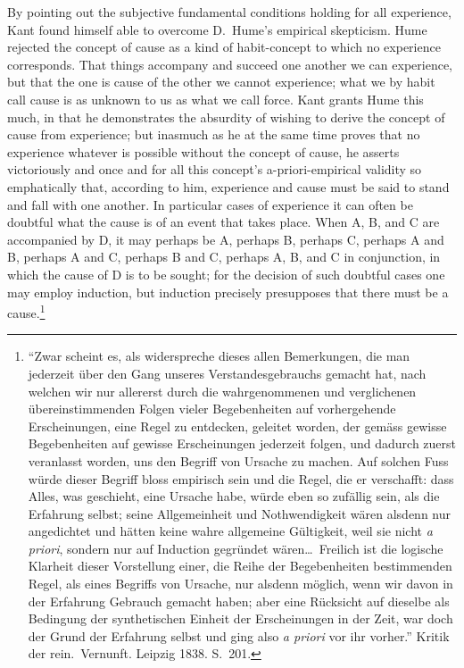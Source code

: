 \documentclass[12pt]{article}
\begin{document}
By pointing out the subjective fundamental conditions holding for all
experience, Kant found himself able to overcome D.\ Hume's empirical
skepticism. Hume rejected the concept of cause as a kind of habit-concept
to which no experience corresponds. That things accompany and succeed one
another we can experience, but that the one is cause of the other we
cannot experience; what we by habit call cause is as unknown to us as what
we call force. Kant grants Hume this much, in that he demonstrates the
absurdity of wishing to derive the concept of cause from experience; but
inasmuch as he at the same time proves that no experience whatever is
possible without the concept of cause, he asserts victoriously and once
and for all this concept's a-priori-empirical validity so emphatically
that, according to him, experience and cause must be said to stand and
fall with one another. In particular cases of experience it can often be
doubtful what the cause is of an event that takes place. When A, B, and C
are accompanied by D, it may perhaps be A, perhaps B, perhaps C, perhaps A
and B, perhaps A and C, perhaps B and C, perhaps A, B, and C in
conjunction, in which the cause of D is to be sought; for the decision of
such doubtful cases one may employ induction, but induction precisely
presupposes that there must be a cause.\footnote{``Zwar scheint es, als
widerspreche dieses allen Bemerkungen, die man jederzeit über den Gang
unseres Verstandesgebrauchs gemacht hat, nach welchen wir nur allererst
durch die wahrgenommenen und verglichenen übereinstimmenden Folgen vieler
Begebenheiten auf vorhergehende Erscheinungen, eine Regel zu entdecken,
geleitet worden, der gemäss gewisse Begebenheiten auf gewisse
Erscheinungen jederzeit folgen, und dadurch zuerst veranlasst worden, uns
den Begriff von Ursache zu machen. Auf solchen Fuss würde dieser Begriff
bloss empirisch sein und die Regel, die er verschafft: dass Alles, was
geschieht, eine Ursache habe, würde eben so zufällig sein, als die
Erfahrung selbst; seine Allgemeinheit und Nothwendigkeit wären alsdenn nur
angedichtet und hätten keine wahre allgemeine Gültigkeit, weil sie nicht
\textit{a priori}, sondern nur auf Induction gegründet wären\ldots\
Freilich ist die logische Klarheit dieser Vorstellung einer, die Reihe der
Begebenheiten bestimmenden Regel, als eines Begriffs von Ursache, nur
alsdenn möglich, wenn wir davon in der Erfahrung Gebrauch gemacht haben;
aber eine Rücksicht auf dieselbe als Bedingung der synthetischen Einheit
der Erscheinungen in der Zeit, war doch der Grund der Erfahrung selbst und
ging also \textit{a priori} vor ihr vorher.'' Kritik der rein.\ Vernunft.
Leipzig 1838. S.~201.}
\end{document}
